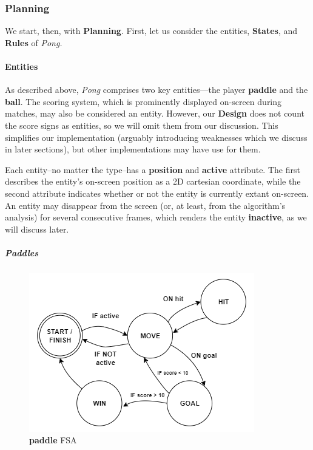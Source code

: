 \documentclass{report}
\newcommand{\plan}{\textbf{Planning}\xspace}
\newcommand{\design}{\textbf{Design}\xspace}
\newcommand{\state}[1]{\textbf{#1}}
\newcommand{\rules}{\textbf{Rules}\xspace}
\newcommand{\pad}{\textbf{paddle}\xspace}
\newcommand{\ball}{\textbf{ball}\xspace}
\begin{document}
\subsubsection{Planning}
We start, then, with \plan. First, let us consider the entities, \state{States}, and \rules of \emph{Pong.}

\paragraph{Entities}

As described above, \emph{Pong} comprises two key entities---the player \pad and the \ball.
The scoring system, which is prominently displayed on-screen during matches, may also be considered an entity. However, our \design does not count the score signs as entities, so we will omit them from our discussion. This simplifies our implementation (arguably introducing weaknesses which we discuss in later sections), but other implementations may have use for them. 

Each entity--no matter the type--has a \state{position} and \state{active} attribute. The first describes the entity's on-screen position as a 2D cartesian coordinate, while the second attribute indicates whether or not the entity is currently extant on-screen. An entity may disappear from the screen (or, at least, from the algorithm's analysis) for several consecutive frames, which renders the entity \state{inactive}, as we will discuss later.

\subparagraph{Paddles}

\begin{figure}
    \includegraphics[width=\textwidth]{PaddleFSA.png}
    \caption{\pad FSA}
    \label{fig:PaddleFSA}
\end{figure}
\end{document}

